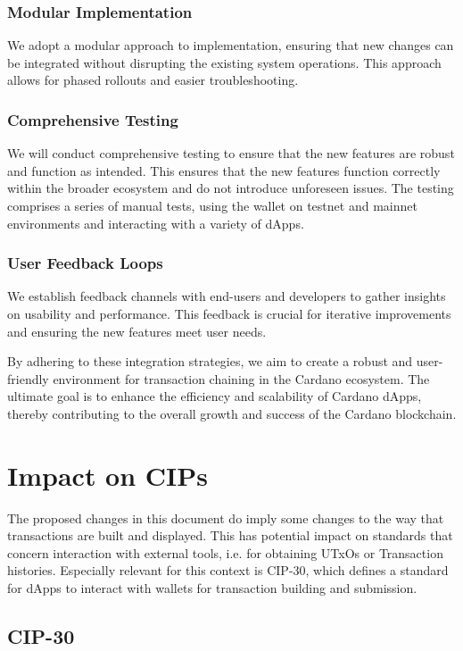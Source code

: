 \documentclass[11pt]{article}
\begin{document}
\subsubsection{Modular Implementation} 
We adopt a modular approach to implementation, ensuring that new changes can be integrated without disrupting the existing system operations.
This approach allows for phased rollouts and easier troubleshooting.

\subsubsection{Comprehensive Testing}
We will conduct comprehensive testing to ensure that the new features are robust and function as intended.
This ensures that the new features function correctly within the broader ecosystem and do not introduce unforeseen issues.
The testing comprises a series of manual tests, using the wallet on testnet and mainnet environments and interacting with a variety of dApps.

\subsubsection{User Feedback Loops}
We establish feedback channels with end-users and developers to gather insights on usability and performance.
This feedback is crucial for iterative improvements and ensuring the new features meet user needs.

By adhering to these integration strategies, we aim to create a robust and user-friendly environment for transaction chaining in the Cardano ecosystem. The ultimate goal is to enhance the efficiency and scalability of Cardano dApps, thereby contributing to the overall growth and success of the Cardano blockchain.

\section{Impact on CIPs}

The proposed changes in this document do imply some changes to the way that transactions are built and displayed.
This has potential impact on standards that concern interaction with external tools, i.e. for obtaining UTxOs or Transaction histories.
Especially relevant for this context is CIP-30, which defines a standard for dApps to interact with wallets for transaction building and submission.

\subsection{CIP-30}
\end{document}
